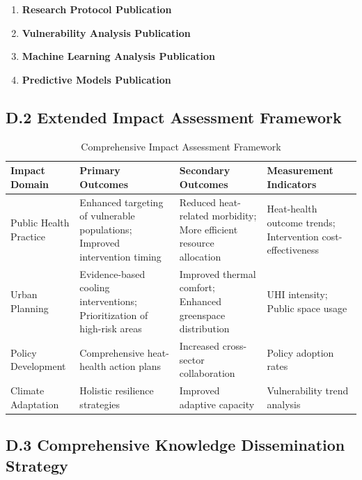 \graphicspath{{./}{./sections/images/}{./images/}}\documentclass[12pt,a4paper,landscape]{article}
\begin{document}
\begin{enumerate}[leftmargin=*, itemsep=0.5em]
    \item \textbf{Research Protocol Publication}
    \item \textbf{Vulnerability Analysis Publication}
    \item \textbf{Machine Learning Analysis Publication}
    \item \textbf{Predictive Models Publication}
\end{enumerate}

\subsection*{D.2 Extended Impact Assessment Framework}
\begin{table}[H]
    \centering
    \caption{Comprehensive Impact Assessment Framework}
    \label{tab:extended_impact}
    \begin{tabular}{L{2.5cm}L{5cm}L{5cm}L{3cm}}
        \toprule
        \textbf{Impact Domain} & \textbf{Primary Outcomes} & \textbf{Secondary Outcomes} & \textbf{Measurement Indicators} \\
        \midrule
        Public Health Practice & 
        Enhanced targeting of vulnerable populations; Improved intervention timing & 
        Reduced heat-related morbidity; More efficient resource allocation & 
        Heat-health outcome trends; Intervention cost-effectiveness \\
        \addlinespace
        Urban Planning & 
        Evidence-based cooling interventions; Prioritization of high-risk areas & 
        Improved thermal comfort; Enhanced greenspace distribution & 
        UHI intensity; Public space usage \\
        \addlinespace
        Policy Development & 
        Comprehensive heat-health action plans & 
        Increased cross-sector collaboration & 
        Policy adoption rates \\
        \addlinespace
        Climate Adaptation & 
        Holistic resilience strategies & 
        Improved adaptive capacity & 
        Vulnerability trend analysis \\
        \bottomrule
    \end{tabular}
\end{table}

\subsection*{D.3 Comprehensive Knowledge Dissemination Strategy}
\end{document}
